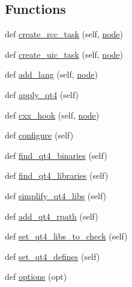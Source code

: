 \subsection*{Functions}
\begin{DoxyCompactItemize}
\item 
def \hyperlink{namespacewaflib_1_1_tools_1_1qt4_a474b0d2fbfa3f41d0be506bd012b75fb}{create\+\_\+rcc\+\_\+task} (self, \hyperlink{structnode}{node})
\item 
def \hyperlink{namespacewaflib_1_1_tools_1_1qt4_ad4a5580d4638234e662477361f0fda9b}{create\+\_\+uic\+\_\+task} (self, \hyperlink{structnode}{node})
\item 
def \hyperlink{namespacewaflib_1_1_tools_1_1qt4_a5b0b5d1bfcb4a4029118af0264dfa58e}{add\+\_\+lang} (self, \hyperlink{structnode}{node})
\item 
def \hyperlink{namespacewaflib_1_1_tools_1_1qt4_ade7298e4ce0fa4005d38b089e4cc24e8}{apply\+\_\+qt4} (self)
\item 
def \hyperlink{namespacewaflib_1_1_tools_1_1qt4_a9e77ad1c524ba2462aae1027b92d847e}{cxx\+\_\+hook} (self, \hyperlink{structnode}{node})
\item 
def \hyperlink{namespacewaflib_1_1_tools_1_1qt4_ab06091d89d2419c0bdcc1a8b4e8a5708}{configure} (self)
\item 
def \hyperlink{namespacewaflib_1_1_tools_1_1qt4_a9d713f54dfc0b93695e51d28b677c38c}{find\+\_\+qt4\+\_\+binaries} (self)
\item 
def \hyperlink{namespacewaflib_1_1_tools_1_1qt4_aaf43095cd0a568379de0c83453ffb82c}{find\+\_\+qt4\+\_\+libraries} (self)
\item 
def \hyperlink{namespacewaflib_1_1_tools_1_1qt4_a1ca1a6f71a509166d314de0b090fd631}{simplify\+\_\+qt4\+\_\+libs} (self)
\item 
def \hyperlink{namespacewaflib_1_1_tools_1_1qt4_ac51854ca134dd7809a306fa60e1e3011}{add\+\_\+qt4\+\_\+rpath} (self)
\item 
def \hyperlink{namespacewaflib_1_1_tools_1_1qt4_ac7cb8f87b4c5e024cf1f935043896c86}{set\+\_\+qt4\+\_\+libs\+\_\+to\+\_\+check} (self)
\item 
def \hyperlink{namespacewaflib_1_1_tools_1_1qt4_a6e8e47988cb2379f9a8c1eafb7d1adfb}{set\+\_\+qt4\+\_\+defines} (self)
\item 
def \hyperlink{namespacewaflib_1_1_tools_1_1qt4_afee9bc1a5bd6ad0a2b0ed1d645c477b1}{options} (opt)
\end{DoxyCompactItemize}
